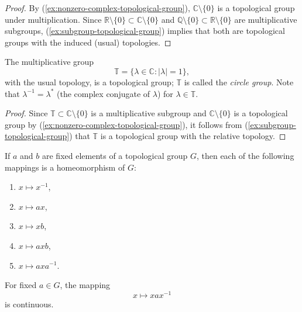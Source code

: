 \begin{proof}
    By (\ref{ex:nonzero-complex-topological-group}), \( \mathbb{C}\setminus\{0\} \) is a topological group under multiplication.
    Since \( \mathbb{R}\setminus\{0\} \subset \mathbb{C}\setminus\{0\} \) and \( \mathbb{Q}\setminus\{0\} \subset \mathbb{R}\setminus\{0\} \) are multiplicative subgroups, (\ref{ex:subgroup-topological-group}) implies that both are topological groups with the induced (usual) topologies.
\end{proof}

\begin{example}
    \label{ex:circle-group}

    The multiplicative group
    \[
        \mathbb{T} = \{ \lambda \in \mathbb{C} : |\lambda| = 1 \},
    \]
    with the usual topology, is a topological group;
    \( \mathbb{T} \) is called the \emph{circle group}.
    Note that \( \lambda^{-1} = \lambda^{*} \) (the complex conjugate of \( \lambda \)) for \( \lambda \in \mathbb{T} \).
\end{example}


\begin{proof}
    Since \( \mathbb{T} \subset \mathbb{C}\setminus\{0\} \) is a multiplicative subgroup and \( \mathbb{C}\setminus\{0\} \) is a topological group by (\ref{ex:nonzero-complex-topological-group}), it follows from (\ref{ex:subgroup-topological-group}) that \( \mathbb{T} \) is a topological group with the relative topology.
\end{proof}


\begin{theorem}
    \label{thm:topological-group-basic-homeomorphisms}

    If \( a \) and \( b \) are fixed elements of a topological group \( G \),
    then each of the following mappings is a homeomorphism of \( G \):
    \begin{enumerate}
        \item \( x \mapsto x^{-1} \),
        \item \( x \mapsto ax \),
        \item \( x \mapsto xb \),
        \item \( x \mapsto axb \),
        \item \( x \mapsto axa^{-1} \).
    \end{enumerate}

    For fixed \( a \in G \), the mapping
    \[
        x \mapsto xax^{-1}
    \]
    is continuous.
\end{theorem}

